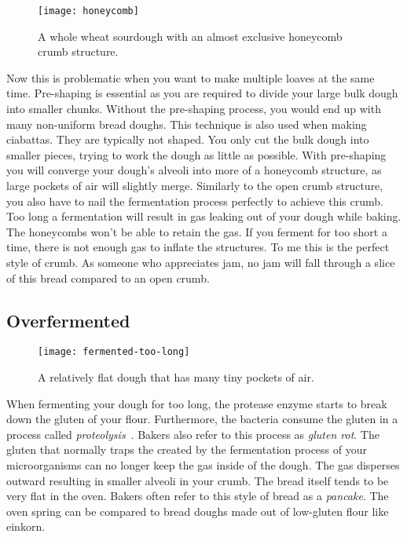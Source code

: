\begin{figure}
  \texttt{[image: honeycomb]}
  \caption[Honeycomb crumb structure]{A whole wheat sourdough with an almost
      exclusive honeycomb crumb structure.}%
  \label{fig:honeycomb}
\end{figure}


Now this is problematic when you want to
make multiple loaves at the same time. Pre-shaping is essential as you are required
to divide your large bulk dough into smaller chunks. Without the pre-shaping
process, you would end up with many non-uniform bread doughs. This technique is
also used when making ciabattas. They are typically not shaped. You only cut the
bulk dough into smaller pieces, trying to work the dough as little as possible.
With pre-shaping you will converge your dough's alveoli into more of a honeycomb structure,
as large pockets of air will slightly merge. Similarly to the open crumb structure,
you also have to nail the fermentation process perfectly to achieve this crumb.
Too long a fermentation will result in gas leaking out of your dough while baking.
The honeycombs won't be able to retain the gas. If you ferment for too short a time,
there is not enough gas to inflate the structures. To me this is the perfect
style of crumb. As someone who appreciates jam, no jam will fall through a slice
of this bread compared to an open crumb.

\subsection{Overfermented}%
\label{subsec:overfermented-dough}

\begin{figure}
  \texttt{[image: fermented-too-long]}
  \caption{A relatively flat dough that has many tiny pockets of air.}%
  \label{fig:fermented-too-long}
\end{figure}

When fermenting your dough for too long, the protease enzyme starts to
break down the gluten of your flour. Furthermore, the bacteria consume the gluten
in a process called \emph{proteolysis}~\cite{raffaella+di+cagno}.
Bakers also refer to this process as \emph{gluten rot}.
The gluten that normally traps the  created
by the fermentation process of your microorganisms can no longer keep the
gas inside of the dough. The gas disperses outward resulting in smaller alveoli in your crumb.
The bread itself tends to be very flat in the oven. Bakers often refer
to this style of bread as a \emph{pancake}. The oven spring can be compared
to bread doughs made out of low-gluten flour like einkorn.

